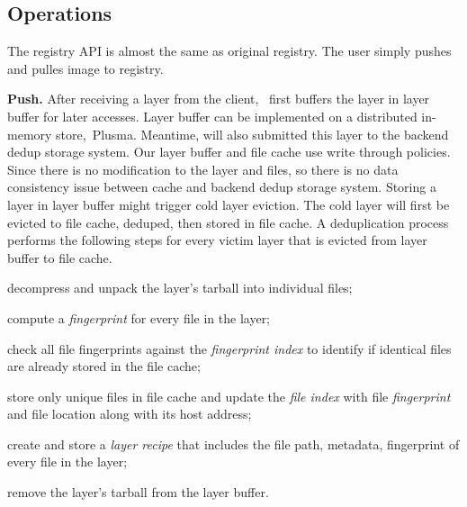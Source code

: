 \subsection{Operations}
\label{sec:design_operations}

%
The registry API is almost the same as original registry.
The user simply pushes and pulles image to registry. 


\textbf{Push.}
After receiving a layer from the client, 
\sysname~first buffers the layer in layer buffer for later accesses. 
Layer buffer can be implemented on a distributed in-memory store,~\eg Plusma.
Meantime, \sysname will also submitted this layer to the backend dedup storage system.
Our layer buffer and file cache use write through policies. 
Since there is no modification to the layer and files, so there is no data consistency issue between
cache and backend dedup storage system.
Storing a layer in layer buffer might trigger cold layer eviction.
The cold layer will first be evicted to file cache, deduped, then stored in file cache.
A deduplication process performs the following steps for every victim layer that is evicted from layer buffer to file cache.

\begin{compactenumerate}
	\item decompress and unpack the layer's tarball into individual files;
	\item compute a \emph{fingerprint} for every file in the layer;
	\item check all file fingerprints against the \emph{fingerprint index} to
	identify if identical files are already stored in the file cache;
	\item store only unique files in file cache and update the 
	\emph{file index} with file \emph{fingerprint} and file location along with its host address;
	\item create and store a \emph{layer recipe} that includes the file path,
	metadata, fingerprint of every file in the layer;
	\item remove the layer's tarball from the layer buffer.
\end{compactenumerate}

